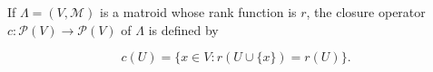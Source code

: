 If $\Lambda = (V, \mathcal{M})$ is a matroid whose rank function is $r$, the closure operator $c: \mathcal{P}(V) \to \mathcal{P}(V)$ of $\Lambda$ is defined by

$$c(U) = \{x \in V : r(U \cup \{x\}) = r(U)\}.$$
